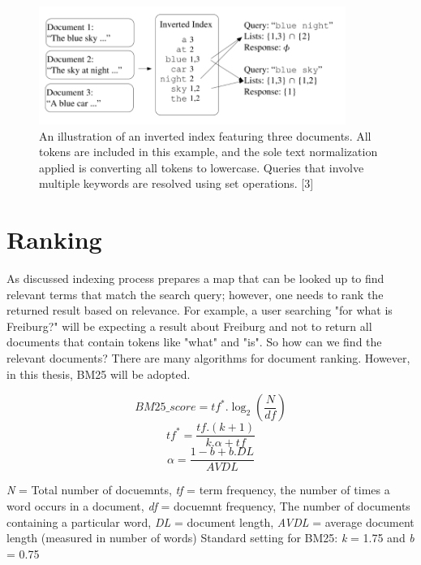 \begin{figure}[h]	
     \centering
     \includegraphics[width=10cm]{images/inverted_index.png}
     \caption{
An illustration of an inverted index featuring three documents. All tokens are included in this example, and the sole text normalization applied is converting all tokens to lowercase. Queries that involve multiple keywords are resolved using set operations. [3]}
     \label{fig:google-arch}
\end{figure}

\section{Ranking}
As discussed indexing process prepares a map that can be looked up to find relevant terms that match the search query; however, one needs to rank the returned result based on relevance. For example, a user searching "for what is Freiburg?" will be expecting a result about Freiburg and not to return all documents that contain tokens like "what" and "is". So how can we find the relevant documents? There are many algorithms for document ranking. However, in this thesis, BM25 will be adopted. 

\begin{equation}
BM25\_score = tf^*.\log_2(\frac{N}{df})
\label{eq:depth}
\end{equation}
\begin{equation}
tf^* = \frac{tf.(k+1)}{k.\alpha+tf}
\label{eq:depth}
\end{equation}
\begin{equation}
\alpha = \frac{1-b+b.DL}{AVDL}
\label{eq:depth}
\end{equation}

\textit{N} = Total number of docuemnts, \textit{tf} = term frequency, the number of times a word occurs in a document, \textit{df} = docuemnt frequency, The number of documents containing a particular word, \textit{DL} = document length, \textit{AVDL} =
average document length (measured in number of words)
Standard setting for BM25: \textit{k} = 1.75 and \textit{b} = 0.75
